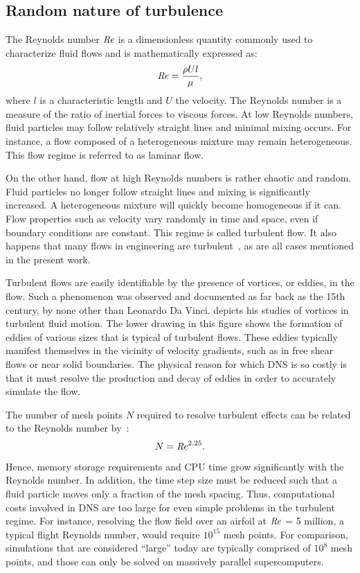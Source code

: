 \subsection{Random nature of turbulence}
\label{sec:random}
%
The Reynolds number $\mbox{\textit{Re}}$ is a dimensionless quantity commonly used to characterize fluid flows and is mathematically expressed as:
\begin{equation*}
    \mbox{\textit{Re}} = \frac{\rho U l}{\mu},
\end{equation*}
where $l$ is a characteristic length and $U$ the velocity. The Reynolds number is a measure of the ratio of inertial forces to viscous forces. At low Reynolds numbers, fluid particles may follow relatively straight lines and minimal mixing occurs. For instance, a flow composed of a heterogeneous mixture may remain heterogeneous. This flow regime is referred to as laminar flow.

On the other hand, flow at high Reynolds numbers is rather chaotic and random. Fluid particles no longer follow straight lines and mixing is significantly increased. A heterogeneous mixture will quickly become homogeneous if it can. Flow properties such as velocity vary randomly in time and space, even if boundary conditions are constant. This regime is called turbulent flow. It also happens that many flows in engineering are turbulent~\cite{versteeg2007introduction}, as are all cases mentioned in the present work.

Turbulent flows are easily identifiable by the presence of vortices, or eddies, in the flow. Such a phenomenon was observed and documented as far back as the 15th century, by none other than Leonardo Da Vinci.  depicts his studies of vortices in turbulent fluid motion. The lower drawing in this figure shows the formation of eddies of various sizes that is typical of turbulent flows. These eddies typically manifest themselves in the vicinity of velocity gradients, such as in free shear flows or near solid boundaries. The physical reason for which DNS is so costly is that it must resolve the production and decay of eddies in order to accurately simulate the flow.

The number of mesh points $N$ required to resolve turbulent effects can be related to the Reynolds number by~\cite{wilcox1998turbulence}:
\begin{equation*}
    N = \mbox{\textit{Re}}^{2.25}.
\end{equation*}
Hence, memory storage requirements and CPU time grow significantly with the Reynolds number. In addition, the time step size must be reduced such that a fluid particle moves only a fraction of the mesh spacing. Thus, computational costs involved in DNS are too large for even simple problems in the turbulent regime. For instance, resolving the flow field over an airfoil at $\mbox{\textit{Re}}$ = 5 million, a typical flight Reynolds number, would require $10^{15}$ mesh points. For comparison, simulations that are considered ``large'' today are typically comprised of $10^{8}$ mesh points, and those can only be solved on massively parallel supercomputers.

